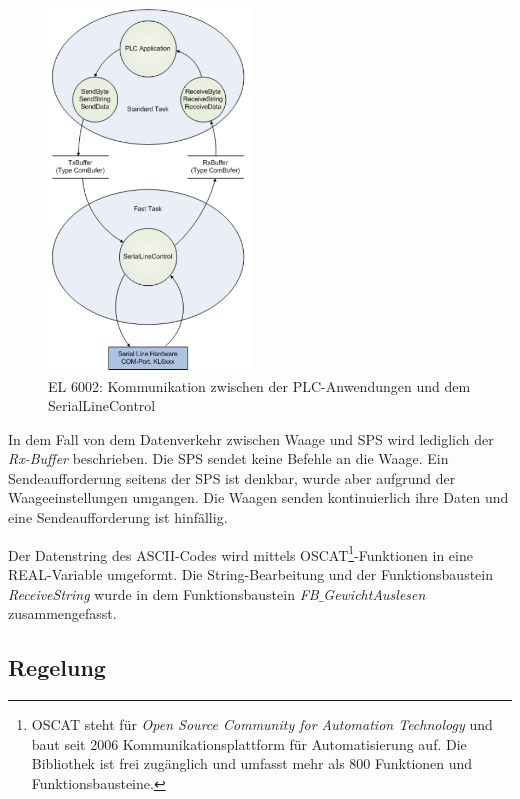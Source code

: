 \begin{figure}[htb]
\centering		\includegraphics[width=0.48\textwidth]{Pictures/RS232_Verarbeitung.png}
\caption{EL 6002: Kommunikation zwischen der PLC-Anwendungen und dem SerialLineControl \citep{Beckhoff2016-2}}
\label{fig:Combuffer}
\end{figure}

In dem Fall von dem Datenverkehr zwischen Waage und SPS wird lediglich der \textit{Rx-Buffer} beschrieben. Die SPS sendet keine Befehle an die Waage. Ein Sendeaufforderung seitens der SPS ist denkbar, wurde aber aufgrund der Waageeinstellungen umgangen. Die Waagen senden kontinuierlich ihre Daten und eine Sendeaufforderung ist hinfällig. 

Der Datenstring des ASCII-Codes wird mittels OSCAT\footnote{OSCAT steht für \textit{Open Source Community for Automation Technology} und baut seit 2006  Kommunikationsplattform für Automatisierung auf. Die Bibliothek ist frei zugänglich und umfasst mehr als 800 Funktionen und Funktionsbausteine.}-Funktionen in eine REAL-Variable umgeformt. Die String-Bearbeitung und der Funktionsbaustein \textit{ReceiveString} wurde in dem Funktionsbaustein \textit{FB$\_$GewichtAuslesen} zusammengefasst.\citep{OSCAT2016}

\subsection{Regelung}
\label{subsec:Regelung}


